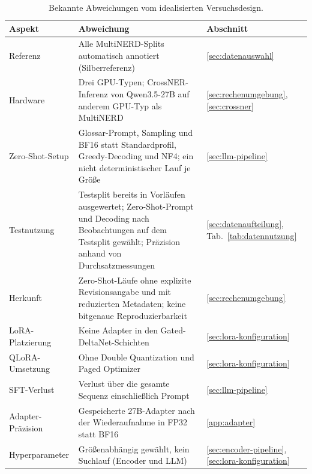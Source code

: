 \begin{table}[ht]
  \centering
  \small
  \caption[Bekannte Abweichungen vom idealisierten Versuchsdesign]{Bekannte Abweichungen vom idealisierten Versuchsdesign.}
  \label{tab:abweichungen}
  \begin{tabularx}{\linewidth}{@{}>{\raggedright\arraybackslash}p{3.3cm}%
      >{\raggedright\arraybackslash}X%
      >{\raggedright\arraybackslash}p{2cm}@{}}
    \toprule
    \textbf{Aspekt} & \textbf{Abweichung} & \textbf{Abschnitt} \\
    \midrule
    Referenz & Alle MultiNERD-Splits automatisch annotiert
      (Silberreferenz) & \ref{sec:datenauswahl} \\
    \addlinespace
    Hardware & Drei GPU-Typen; CrossNER-Inferenz von Qwen3.5-27B auf
      anderem GPU-Typ als MultiNERD & \ref{sec:rechenumgebung},
      \ref{sec:crossner} \\
    \addlinespace
    Zero-Shot-Setup & Glossar-Prompt, Sampling und BF16 statt
      Standardprofil, Greedy-Decoding und NF4; ein nicht
      deterministischer Lauf je Größe & \ref{sec:llm-pipeline} \\
    \addlinespace
    Testnutzung & Testsplit bereits in Vorläufen ausgewertet;
      Zero-Shot-Prompt und Decoding nach Beobachtungen auf dem Testsplit
      gewählt;
      Präzision anhand von Durchsatzmessungen & \ref{sec:datenaufteilung},
      Tab.~\ref{tab:datennutzung} \\
    \addlinespace
    Herkunft & Zero-Shot-Läufe ohne explizite Revisionsangabe und mit reduzierten
      Metadaten; keine bitgenaue Reproduzierbarkeit &
      \ref{sec:rechenumgebung} \\
    \addlinespace
    LoRA-Platzierung & Keine Adapter in den Gated-DeltaNet-Schichten &
      \ref{sec:lora-konfiguration} \\
    \addlinespace
    QLoRA-Umsetzung & Ohne Double Quantization und Paged Optimizer &
      \ref{sec:lora-konfiguration} \\
    \addlinespace
    SFT-Verlust & Verlust über die gesamte Sequenz einschließlich Prompt
      & \ref{sec:llm-pipeline} \\
    \addlinespace
    Adapter-Präzision & Gespeicherte 27B-Adapter nach der Wiederaufnahme in
      FP32 statt BF16 & \ref{app:adapter} \\
    \addlinespace
    Hyperparameter & Größenabhängig gewählt, kein Suchlauf (Encoder und
      LLM) & \ref{sec:encoder-pipeline}, \ref{sec:lora-konfiguration} \\

\end{tabularx}
\end{table}
